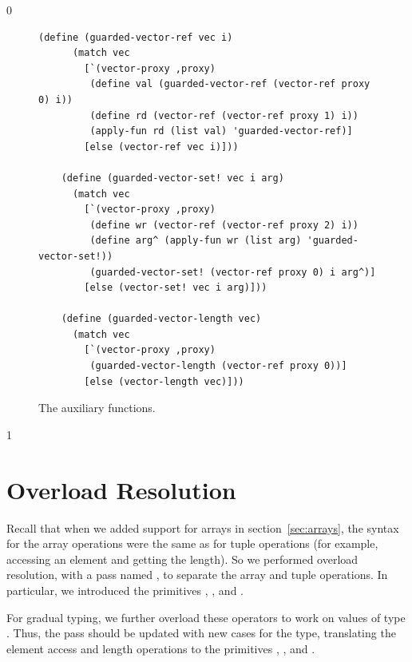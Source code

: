 \documentclass[7x10]{TimesAPriori_MIT}%
\def\racketEd{0}
\def\pythonEd{1}
\def\edition{1}
\newcommand{\pythonColor}[0]{}
\numberwithin{theorem}{chapter}
\numberwithin{definition}{chapter}
\numberwithin{equation}{chapter}
\begin{document}
{\if\edition\racketEd    
\begin{figure}[tbp]
\begin{tcolorbox}[colback=white]  
\begin{lstlisting}[basicstyle=\ttfamily\footnotesize]
    (define (guarded-vector-ref vec i)
      (match vec
        [`(vector-proxy ,proxy)
         (define val (guarded-vector-ref (vector-ref proxy 0) i))
         (define rd (vector-ref (vector-ref proxy 1) i))
         (apply-fun rd (list val) 'guarded-vector-ref)]
        [else (vector-ref vec i)]))
        
    (define (guarded-vector-set! vec i arg)
      (match vec
        [`(vector-proxy ,proxy)
         (define wr (vector-ref (vector-ref proxy 2) i))
         (define arg^ (apply-fun wr (list arg) 'guarded-vector-set!))
         (guarded-vector-set! (vector-ref proxy 0) i arg^)]
        [else (vector-set! vec i arg)]))
        
    (define (guarded-vector-length vec)
      (match vec
        [`(vector-proxy ,proxy)
         (guarded-vector-length (vector-ref proxy 0))]
        [else (vector-length vec)]))
\end{lstlisting}
\end{tcolorbox}

\caption{The  auxiliary functions.}
  \label{fig:guarded-tuple}
\end{figure}
\fi}

{\if\edition\pythonEd\pythonColor
\section{Overload Resolution}
\label{sec:gradual-resolution}

Recall that when we added support for arrays in
section~\ref{sec:arrays}, the syntax for the array operations were the
same as for tuple operations (for example, accessing an element and
getting the length). So we performed overload resolution, with a pass
named , to separate the array and tuple operations.  In
particular, we introduced the primitives ,
, and .

For gradual typing, we further overload these operators to work on
values of type \CANYTY{}. Thus, the  pass should be
updated with new cases for the \CANYTY{} type, translating the element
access and length operations to the primitives ,
, and .

\fi}
\end{document}
